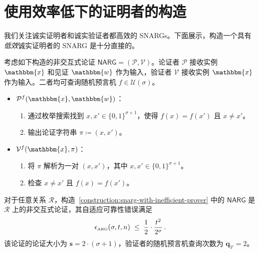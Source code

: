 \documentclass[american,singlepageview]{snargs-book-zh}
\renewcommand{\enspace}{\ensuremath{\thinspace}}
\newcommand{\Bits}{\{0,1\}}
\newcommand{\DefineEqual}{\coloneqq}
\newcommand{\Relation}{\mathcal{R}}
\newcommand{\Instance}{\mathbbm{x}}
\newcommand{\Witness}{\mathbbm{w}}
\newcommand{\InstanceSize}{n}
\newcommand{\ProtoProver}{P}
\newcommand{\ProtoVerifier}{V}
\newcommand{\ProtoSoundnessError}{\epsilon}
\newcommand{\NARGSymbol}{\mathsf{NARG}}
\newcommand{\ARGSubscript}{\scriptscriptstyle\mathrm{ARG}}
\newcommand{\ARGFormat}[1]{\mathcal{#1}}
\newcommand{\ARGProver}{\ARGFormat{\ProtoProver}}
\newcommand{\ARGVerifier}{\ARGFormat{\ProtoVerifier}}
\newcommand{\ARGSystem}{(\ARGProver,\ARGVerifier)}
\newcommand{\ARGString}{\pi}
\newcommand{\ARGSoundnessError}{\ProtoSoundnessError_{\ARGSubscript}}
\newcommand{\ARGComplexityFormat}[1]{\mathbf{#1}}
\newcommand{\ARGQueryV}{\ARGComplexityFormat{q}_{\scriptscriptstyle\ARGVerifier}}
\newcommand{\ARGLength}{\ARGComplexityFormat{s}}
\newcommand{\ROFunction}{f}
\newcommand{\ROQueryBound}{t}
\newcommand{\RODistribution}[1]{\mathcal{U}(#1)}
\newcommand{\ROQuery}{x}
\newcommand{\ROOutputSize}{\sigma}
\newcommand{\ROCommonExpression}[2]{\frac{1}{2} \cdot \frac{#2^2}{2^{#1}}}
\begin{document}
\section{使用效率低下的证明者的构造}
\label{section:inefficient-prover-construction}

我们关注诚实证明者和诚实验证者都高效的 SNARGs。下面展示，构造一个具有\emph{低效}诚实证明者的 SNARG 是十分直接的。

\begin{construction}
\label{construction:snarg-with-inefficient-prover}
考虑如下构造的非交互式论证 $\NARGSymbol=\ARGSystem$。论证者 $\ARGProver$ 接收实例 $\Instance$ 和见证 $\Witness$ 作为输入，验证者 $\ARGVerifier$ 接收实例 $\Instance$ 作为输入。二者均可查询随机预言机 $\ROFunction \in \RODistribution{\ROOutputSize}$。
\begin{itemize}[noitemsep]
  \item $\ARGProver^{\ROFunction}(\Instance,\Witness)$：
    \begin{enumerate}[nolistsep]
      \item 通过枚举搜索找到 $\ROQuery,\ROQuery' \in \Bits^{\ROOutputSize+1}$，使得 $\ROFunction(\ROQuery)=\ROFunction(\ROQuery')$ 且 $\ROQuery\neq\ROQuery'$。
      \item 输出论证字符串 $\ARGString \DefineEqual (\ROQuery,\ROQuery')$。
    \end{enumerate}

  \item $\ARGVerifier^{\ROFunction}(\Instance,\ARGString)$：
    \begin{enumerate}[nolistsep]
      \item 将 $\ARGString$ 解析为一对 $(\ROQuery,\ROQuery')$，其中 $\ROQuery,\ROQuery' \in \Bits^{\ROOutputSize+1}$。
      \item 检查 $\ROQuery\neq\ROQuery'$ 且 $\ROFunction(\ROQuery)=\ROFunction(\ROQuery')$。
    \end{enumerate}
\end{itemize}
\end{construction}

\begin{lemma}
\label{lemma:small-argument-with-inefficient-prover}
对于任意关系 $\Relation$，构造~\ref{construction:snarg-with-inefficient-prover} 中的 $\NARGSymbol$ 是 $\Relation$ 上的非交互式论证，其自适应可靠性错误满足
\[
\ARGSoundnessError(\ROOutputSize,\ROQueryBound,\InstanceSize)
\;\leq\;
\ROCommonExpression{\ROOutputSize}{\ROQueryBound}
\enspace.
\]
该论证的论证大小为 $\ARGLength = 2\cdot(\ROOutputSize+1)$，验证者的随机预言机查询次数为 $\ARGQueryV = 2$。
\end{lemma}
\end{document}
